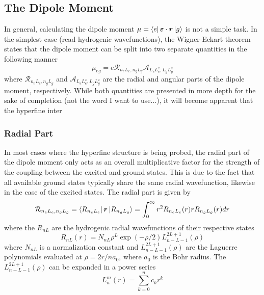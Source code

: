 \documentclass[12pt,a4paper,margin=1in]{report}
\begin{document}
\subsection{The Dipole Moment}
In general, calculating the dipole moment  $\mu = \bra{e} \bm{\varepsilon} \cdot \bm{r} \ket{g}$ is not a simple task. 
In the simplest case (read hydrogenic wavefunctions), the Wigner-Eckart theorem states that the dipole moment can be split into two separate quantities in the following manner
\begin{equation}
\mu_{eg} = e \mathcal{R}_{n_e L_e, n_g L_g}\mathcal{A}_{L_eL_e^z, L_gL_g^z}
\label{muref}
\end{equation}
where $\mathcal{R}_{n_e L_e, n_g L_g}$ and $\mathcal{A}_{L_eL_e^z, L_gL_g^z}$ are the radial and angular parts of the dipole moment, respectively. While both quantities are presented in more depth for the sake of completion (not the word I want to use...), it will become apparent that the hyperfine inter

\subsubsection*{Radial Part}
In most cases where the hyperfine structure is being probed, the radial part of the dipole moment only acts as an overall multiplicative factor for the strength of the coupling between the excited and ground states. This is due to the fact that all available ground states typically share the same radial wavefunction, likewise in the case of the excited states. The radial part is given by
\begin{equation}
\mathcal{R}_{n_e L_e, n_g L_g} = \bra{R_{n_e L_e}}\bm{r}\ket{R_{n_g L_g}} = \int_0^{\infty}r^2R_{n_e L_e}(r)rR_{n_g L_g}(r)dr
\end{equation}
where the $R_{nL}$ are the hydrogenic radial wavefunctions of their respective states
\begin{equation}
R_{nL}(r) = N_{nL}\rho^L\exp(-\rho/2)L_{n-L-1}^{2L+1}(\rho)
\end{equation}
where $N_{nL}$ is a normalization constant and $L_{n-L-1}^{2L+1}(\rho)$ are the Laguerre polynomials evaluated at $\rho = 2r/na_0$, where $a_0$ is the Bohr radius. The $L_{n-L-1}^{2L+1}(\rho)$ can be expanded in a power series
\begin{equation}
L_{n}^{m}(r) = \sum_{k=0}^{n} c_kr^k
\end{equation}
\end{document}

